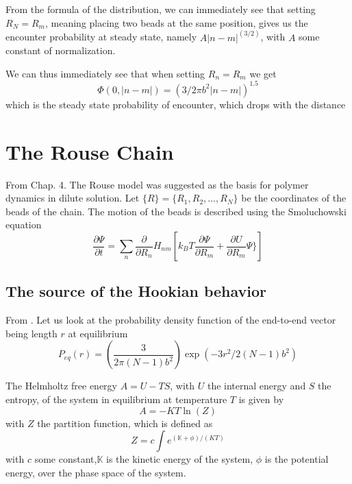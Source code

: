 \documentclass{paper}
\begin{document}
From the formula of the distribution, we can immediately see that setting $R_N=R_m$, meaning placing two beads at the same position, gives us the encounter probability at steady state, namely $A|n-m|^(3/2)$, with $A$ some constant of normalization. 

We can thus immediately see that when setting $R_n=R_m$ we get 
\begin{equation*}
\Phi(0,|n-m|)=(3/2\pi b^2 |n-m|)^{1.5}
\end{equation*}
which is the steady state probability of encounter, which drops with the distance





\section{The Rouse Chain}\label{section_theRouseChain}
From \cite{doi1986theory} Chap. 4. The Rouse model was suggested as the basis for polymer dynamics in dilute solution. Let $\{R\}=\{R_1,R_2,...,R_N\}$ be the coordinates of the beads of the chain. The motion of the beads is described using the Smoluchowski equation
\begin{equation*}
\frac{\partial \Psi}{\partial t }=\sum_n \frac{\partial}{\partial R_n}H_{nm}\left[k_BT\frac{\partial \Psi}{\partial R_m}+\frac{\partial U}{\partial R_m}\Psi\}\right]
\end{equation*}

\subsection{The source of the Hookian behavior}\label{subsection_sourceOfTheHookianBehavior}
From \cite{bird1987dynamics}. Let us look at the probability density function of the end-to-end vector being length $r$ at equilibrium
\begin{equation*}
P_{eq}(r)= \left(\frac{3}{2\pi (N-1)b^2}\right)\exp(-3r^2/2(N-1)b^2)
\end{equation*}

 The Helmholtz free energy $A=U-TS$, with $U$ the internal energy and $S$ the entropy, of the system in equilibrium at temperature $T$ is given by 
\begin{equation*}
A=-KT\ln(Z)
\end{equation*}
with $Z$ the partition function, which is defined as 
\begin{equation*}
Z=c\int e^{(\mathbb{K+\phi})/(KT)}
\end{equation*}
with $c$ some constant,$\mathbb{K}$ is the kinetic energy of the system, $\mathbb{\phi}$ is the potential energy, over the phase space of the system. 
\end{document}
